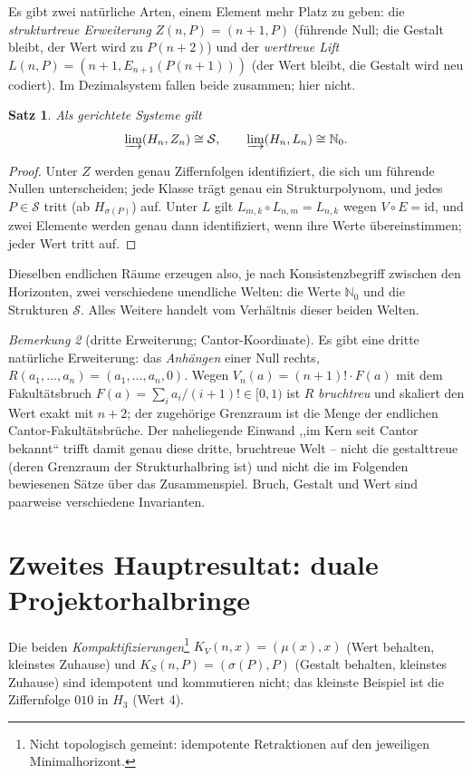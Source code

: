 \documentclass[11pt]{article}
\newtheorem{satz}{Satz}[section]
\theoremstyle{definition}
\theoremstyle{remark}
\newtheorem{bemerkung}[satz]{Bemerkung}
\newcommand{\Struk}{\mathcal S}
\newcommand{\NN}{\mathbb N_0}
\newcommand{\KV}{K_V}
\newcommand{\KS}{K_S}
\begin{document}
Es gibt zwei natürliche Arten, einem Element mehr Platz zu geben:
die \emph{strukturtreue Erweiterung} $Z(n,P)=(n+1,P)$ (führende
Null; die Gestalt bleibt, der Wert wird zu $P(n+2)$) und der
\emph{werttreue Lift} $L(n,P)=(n+1,E_{n+1}(P(n+1)))$ (der Wert
bleibt, die Gestalt wird neu codiert). Im Dezimalsystem fallen beide
zusammen; hier nicht.

\begin{satz}\label{satz:limits}
Als gerichtete Systeme gilt
\[
\varinjlim(H_n,Z_n)\cong\Struk,
\qquad
\varinjlim(H_n,L_n)\cong\NN .
\]
\end{satz}

\begin{proof}
Unter $Z$ werden genau Ziffernfolgen identifiziert, die sich um
führende Nullen unterscheiden; jede Klasse trägt genau ein
Strukturpolynom, und jedes $P\in\Struk$ tritt (ab $H_{\sigma(P)}$)
auf. Unter $L$ gilt $L_{m,k}\circ L_{n,m}=L_{n,k}$ wegen
$V\circ E=\mathrm{id}$, und zwei Elemente werden genau dann
identifiziert, wenn ihre Werte übereinstimmen; jeder Wert tritt auf.
\end{proof}

Dieselben endlichen Räume erzeugen also, je nach Konsistenzbegriff
zwischen den Horizonten, zwei verschiedene unendliche Welten:
die Werte $\NN$ und die Strukturen $\Struk$. Alles Weitere handelt
vom Verhältnis dieser beiden Welten.

\begin{bemerkung}[dritte Erweiterung; Cantor-Koordinate]
Es gibt eine dritte natürliche Erweiterung: das \emph{Anhängen}
einer Null rechts, $R(a_1,\ldots,a_n)=(a_1,\ldots,a_n,0)$. Wegen
$V_n(a)=(n+1)!\cdot F(a)$ mit dem Fakultätsbruch
$F(a)=\sum_i a_i/(i+1)!\in[0,1)$ ist $R$ \emph{bruchtreu} und
skaliert den Wert exakt mit $n+2$; der zugehörige Grenzraum ist die
Menge der endlichen Cantor-Fakultätsbrüche. Der naheliegende Einwand
,,im Kern seit Cantor bekannt`` trifft damit genau diese dritte,
bruchtreue Welt -- nicht die gestalttreue (deren Grenzraum der
Strukturhalbring ist) und nicht die im Folgenden bewiesenen Sätze
über das Zusammenspiel. Bruch, Gestalt und Wert sind paarweise
verschiedene Invarianten.
\end{bemerkung}

\section{Zweites Hauptresultat: duale Projektorhalbringe}

Die beiden \emph{Kompaktifizierungen}\footnote{Nicht
topologisch gemeint: idempotente Retraktionen auf den jeweiligen
Minimalhorizont.}
$\KV(n,x)=(\mu(x),x)$ (Wert behalten, kleinstes Zuhause) und
$\KS(n,P)=(\sigma(P),P)$ (Gestalt behalten, kleinstes Zuhause) sind
idempotent und kommutieren nicht; das kleinste Beispiel ist die
Ziffernfolge $010$ in $H_3$ (Wert 4).
\end{document}
